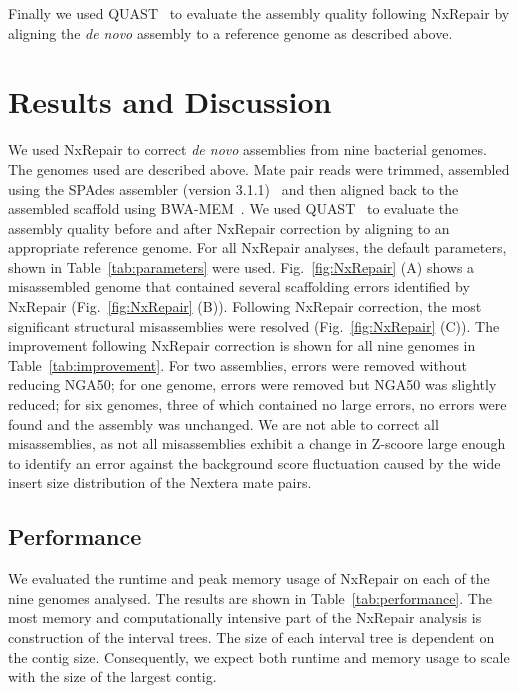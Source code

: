 \documentclass[fleqn,10pt]{wlpeerj}
\begin{document}
Finally we used QUAST~\citep{gurevich2013} to evaluate the assembly quality following NxRepair by aligning the \textit{de novo} assembly to a reference genome as described above.


\section*{Results and Discussion}
We used NxRepair to correct \textit{de novo} assemblies from nine bacterial genomes. The genomes used are described above. Mate pair reads were trimmed, assembled using the SPAdes assembler (version 3.1.1)~\citep{Bankevich2012} and then aligned back to the assembled scaffold using BWA-MEM~\citep{li2013}. We used QUAST~\citep{gurevich2013} to evaluate the assembly quality before and after NxRepair correction by aligning to an appropriate reference genome. For all NxRepair analyses, the default parameters, shown in Table~\ref{tab:parameters} were used. Fig.~\ref{fig:NxRepair} (A) shows a misassembled genome that contained several scaffolding errors identified by NxRepair (Fig.~\ref{fig:NxRepair} (B)). Following NxRepair correction, the most significant structural misassemblies were resolved (Fig.~\ref{fig:NxRepair} (C)). The improvement following NxRepair correction is shown for all nine genomes in Table~\ref{tab:improvement}. For two assemblies, errors were removed without reducing NGA50; for one genome, errors were removed but NGA50 was slightly reduced; for six genomes, three of which contained no large errors, no errors were found and the assembly was unchanged. We are not able to correct all misassemblies, as not all misassemblies exhibit a change in Z-scoore large enough to identify an error against the background score fluctuation caused by the wide insert size distribution of the Nextera mate pairs.

\subsection*{Performance}
We evaluated the runtime and peak memory usage of NxRepair on each of the nine genomes analysed. The results are shown in Table~\ref{tab:performance}. The most memory and computationally intensive part of the NxRepair analysis is construction of the interval trees. The size of each interval tree is dependent on the contig size. Consequently, we expect both runtime and memory usage to scale with the size of the largest contig. 
\end{document}
